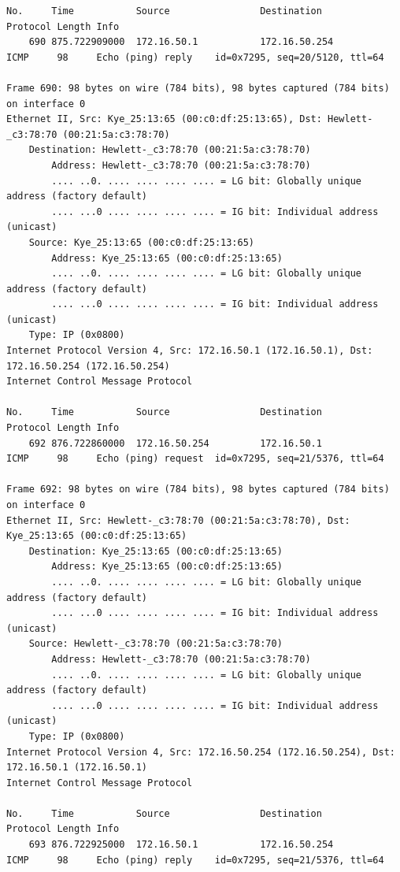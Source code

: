 \documentclass[a4paper,11pt]{article}
\begin{document}
\begin{lstlisting}
No.     Time           Source                Destination           Protocol Length Info
    690 875.722909000  172.16.50.1           172.16.50.254         ICMP     98     Echo (ping) reply    id=0x7295, seq=20/5120, ttl=64

Frame 690: 98 bytes on wire (784 bits), 98 bytes captured (784 bits) on interface 0
Ethernet II, Src: Kye_25:13:65 (00:c0:df:25:13:65), Dst: Hewlett-_c3:78:70 (00:21:5a:c3:78:70)
    Destination: Hewlett-_c3:78:70 (00:21:5a:c3:78:70)
        Address: Hewlett-_c3:78:70 (00:21:5a:c3:78:70)
        .... ..0. .... .... .... .... = LG bit: Globally unique address (factory default)
        .... ...0 .... .... .... .... = IG bit: Individual address (unicast)
    Source: Kye_25:13:65 (00:c0:df:25:13:65)
        Address: Kye_25:13:65 (00:c0:df:25:13:65)
        .... ..0. .... .... .... .... = LG bit: Globally unique address (factory default)
        .... ...0 .... .... .... .... = IG bit: Individual address (unicast)
    Type: IP (0x0800)
Internet Protocol Version 4, Src: 172.16.50.1 (172.16.50.1), Dst: 172.16.50.254 (172.16.50.254)
Internet Control Message Protocol

No.     Time           Source                Destination           Protocol Length Info
    692 876.722860000  172.16.50.254         172.16.50.1           ICMP     98     Echo (ping) request  id=0x7295, seq=21/5376, ttl=64

Frame 692: 98 bytes on wire (784 bits), 98 bytes captured (784 bits) on interface 0
Ethernet II, Src: Hewlett-_c3:78:70 (00:21:5a:c3:78:70), Dst: Kye_25:13:65 (00:c0:df:25:13:65)
    Destination: Kye_25:13:65 (00:c0:df:25:13:65)
        Address: Kye_25:13:65 (00:c0:df:25:13:65)
        .... ..0. .... .... .... .... = LG bit: Globally unique address (factory default)
        .... ...0 .... .... .... .... = IG bit: Individual address (unicast)
    Source: Hewlett-_c3:78:70 (00:21:5a:c3:78:70)
        Address: Hewlett-_c3:78:70 (00:21:5a:c3:78:70)
        .... ..0. .... .... .... .... = LG bit: Globally unique address (factory default)
        .... ...0 .... .... .... .... = IG bit: Individual address (unicast)
    Type: IP (0x0800)
Internet Protocol Version 4, Src: 172.16.50.254 (172.16.50.254), Dst: 172.16.50.1 (172.16.50.1)
Internet Control Message Protocol

No.     Time           Source                Destination           Protocol Length Info
    693 876.722925000  172.16.50.1           172.16.50.254         ICMP     98     Echo (ping) reply    id=0x7295, seq=21/5376, ttl=64


\end{lstlisting}
\end{document}
